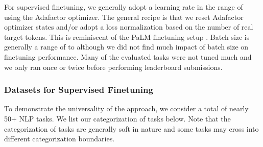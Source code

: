 \documentclass[10pt]{article}
\begin{document}
For supervised finetuning, we generally adopt a learning rate in the range of  using the Adafactor optimizer. The general recipe is that we reset Adafactor optimizer states and/or adopt a loss normalization based on the number of real target tokens. This is reminiscent of the PaLM finetuning setup \citep{chowdhery2022palm}. Batch size is generally a range of  to  although we did not find much impact of batch size on finetuning performance. Many of the evaluated tasks were not tuned much and we only ran once or twice before performing leaderboard submissions.  

\subsubsection{Datasets for Supervised Finetuning}
To demonstrate the universality of the approach, we consider a total of nearly 50+ NLP tasks. We list our categorization of tasks below. Note that the categorization of tasks are generally soft in nature and some tasks may cross into different categorization boundaries.
\end{document}
